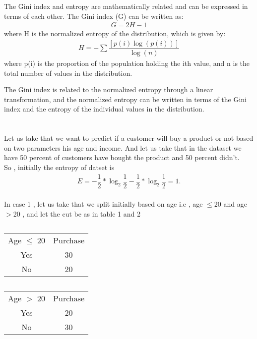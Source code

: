 \documentclass[12pt,a4paper]{article}
\begin{document}
\section{}
The Gini index and entropy are mathematically related and can be expressed in terms of each other.
The Gini index (G) can be written as:
\begin{align*}
    G = 2H - 1
\end{align*}
where H is the normalized entropy of the distribution, which is given by:
\begin{align*}
    H = -\sum \dfrac{[p(i)\log(p(i))]}{\log(n)}
\end{align*}
where p(i) is the proportion of the population holding the ith value, and n is the total number of values in the distribution.

The Gini index is related to the normalized entropy through a linear transformation, and the normalized entropy can be written in terms of the Gini index and the entropy of the individual values in the distribution.

\section{}
Let us take that we want to predict if a customer will buy a product or not based on two parameters his age and income. And let us take that in the dataset we have 50 percent of customers have bought the product and 50 percent didn't.
\\
So , initially the entropy of datset is 
\begin{align*}
    E = -\dfrac{1}{2}* \log_2{\dfrac{1}{2}} - \dfrac{1}{2}* \log_2{\dfrac{1}{2}} = 1.
\end{align*}
\\
In case 1 , let us take that we split initially based on age i.e , age $\le$20 and age$>$20 , and let the cut be as in table 1 and 2 
\begin{table}[]
    \centering
    \begin{tabular}{c|c}
        Age $\le$ 20 & Purchase \\
        Yes & 30 \\
        No & 20
    \end{tabular}
    \caption{}
    \label{tab:my_label}
\end{table}
\begin{table}[]
    \centering
    \begin{tabular}{c|c}
        Age $>$ 20 & Purchase \\
        Yes & 20 \\
        No & 30
    \end{tabular}
    \caption{}
    \label{tab:my_label}
\end{table}
\end{document}
